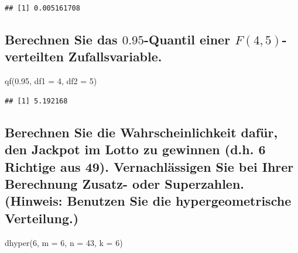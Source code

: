 \documentclass[12pt,a4paper]{article}
\newenvironment{Shaded}{\begin{snugshade}}{\end{snugshade}}
\newcommand{\AttributeTok}[1]{\textcolor[rgb]{0.77,0.63,0.00}{#1}}
\newcommand{\DecValTok}[1]{\textcolor[rgb]{0.00,0.00,0.81}{#1}}
\newcommand{\FloatTok}[1]{\textcolor[rgb]{0.00,0.00,0.81}{#1}}
\newcommand{\FunctionTok}[1]{\textcolor[rgb]{0.00,0.00,0.00}{#1}}
\newcommand{\NormalTok}[1]{#1}
\begin{document}
\begin{verbatim}
## [1] 0.005161708
\end{verbatim}

\hypertarget{berechnen-sie-das-0.95-quantil-einer-f4-5-verteilten-zufallsvariable.}{%
\subsection{\texorpdfstring{Berechnen Sie das \(0.95\)-Quantil einer
\(F(4, 5)\)-verteilten
Zufallsvariable.}{Berechnen Sie das 0.95-Quantil einer F(4, 5)-verteilten Zufallsvariable.}}\label{berechnen-sie-das-0.95-quantil-einer-f4-5-verteilten-zufallsvariable.}}

\begin{Shaded}
\begin{Highlighting}[]
    \FunctionTok{qf}\NormalTok{(}\FloatTok{0.95}\NormalTok{, }\AttributeTok{df1 =} \DecValTok{4}\NormalTok{, }\AttributeTok{df2 =} \DecValTok{5}\NormalTok{)}
\end{Highlighting}
\end{Shaded}

\begin{verbatim}
## [1] 5.192168
\end{verbatim}

\hypertarget{berechnen-sie-die-wahrscheinlichkeit-dafuxfcr-den-jackpot-im-lotto-zu-gewinnen-d.h.-6-richtige-aus-49.-vernachluxe4ssigen-sie-bei-ihrer-berechnung-zusatz--oder-superzahlen.-hinweis-benutzen-sie-die-hypergeometrische-verteilung.}{%
\subsection{Berechnen Sie die Wahrscheinlichkeit dafür, den Jackpot im
Lotto zu gewinnen (d.h. 6 Richtige aus 49). Vernachlässigen Sie bei
Ihrer Berechnung Zusatz- oder Superzahlen. (Hinweis: Benutzen Sie die
hypergeometrische
Verteilung.)}\label{berechnen-sie-die-wahrscheinlichkeit-dafuxfcr-den-jackpot-im-lotto-zu-gewinnen-d.h.-6-richtige-aus-49.-vernachluxe4ssigen-sie-bei-ihrer-berechnung-zusatz--oder-superzahlen.-hinweis-benutzen-sie-die-hypergeometrische-verteilung.}}

\begin{Shaded}
\begin{Highlighting}[]
    \FunctionTok{dhyper}\NormalTok{(}\DecValTok{6}\NormalTok{, }\AttributeTok{m =} \DecValTok{6}\NormalTok{, }\AttributeTok{n =} \DecValTok{43}\NormalTok{, }\AttributeTok{k =} \DecValTok{6}\NormalTok{)}
\end{Highlighting}
\end{Shaded}
\end{document}

